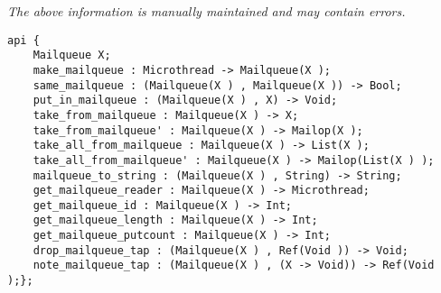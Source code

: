 \label{api:Mailqueue}

{\tiny \it The above information is manually maintained and may contain errors.}
\begin{verbatim}
api {
    Mailqueue X;
    make_mailqueue : Microthread -> Mailqueue(X );
    same_mailqueue : (Mailqueue(X ) , Mailqueue(X )) -> Bool;
    put_in_mailqueue : (Mailqueue(X ) , X) -> Void;
    take_from_mailqueue : Mailqueue(X ) -> X;
    take_from_mailqueue' : Mailqueue(X ) -> Mailop(X );
    take_all_from_mailqueue : Mailqueue(X ) -> List(X );
    take_all_from_mailqueue' : Mailqueue(X ) -> Mailop(List(X ) );
    mailqueue_to_string : (Mailqueue(X ) , String) -> String;
    get_mailqueue_reader : Mailqueue(X ) -> Microthread;
    get_mailqueue_id : Mailqueue(X ) -> Int;
    get_mailqueue_length : Mailqueue(X ) -> Int;
    get_mailqueue_putcount : Mailqueue(X ) -> Int;
    drop_mailqueue_tap : (Mailqueue(X ) , Ref(Void )) -> Void;
    note_mailqueue_tap : (Mailqueue(X ) , (X -> Void)) -> Ref(Void );};
\end{verbatim}
